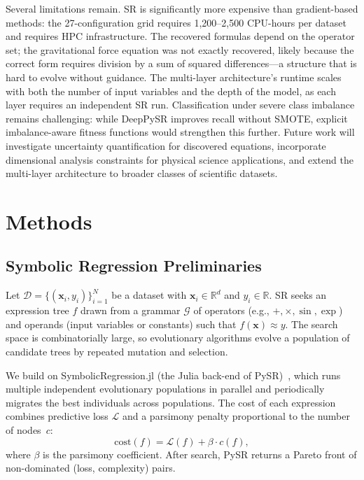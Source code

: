 \documentclass[10pt,twocolumn]{article}
\begin{document}
Several limitations remain.  SR is significantly more expensive than
gradient-based methods: the 27-configuration grid requires 1,200–2,500
CPU-hours per dataset and requires HPC infrastructure.  The recovered formulas
depend on the operator set; the gravitational force equation was not exactly
recovered, likely because the correct form requires division by a sum of
squared differences—a structure that is hard to evolve without guidance.
The multi-layer architecture's runtime scales with both the number of input
variables and the depth of the model, as each layer requires an independent
SR run.  Classification under severe class imbalance remains challenging:
while DeepPySR improves recall without SMOTE, explicit imbalance-aware fitness
functions would strengthen this further.  Future work will investigate
uncertainty quantification for discovered equations, incorporate dimensional
analysis constraints for physical science applications, and extend the
multi-layer architecture to broader classes of scientific datasets.

\section{Methods}
\label{sec:methods}

\subsection{Symbolic Regression Preliminaries}
\label{sec:sr_prelim}

Let $\mathcal{D} = \{(\mathbf{x}_i, y_i)\}_{i=1}^N$ be a dataset with
$\mathbf{x}_i \in \mathbb{R}^d$ and $y_i \in \mathbb{R}$.  SR seeks an
expression tree $f$ drawn from a grammar $\mathcal{G}$ of operators
(e.g., $+, \times, \sin, \exp$) and operands (input variables or constants)
such that $f(\mathbf{x}) \approx y$.  The search space is combinatorially
large, so evolutionary algorithms evolve a population of candidate trees by
repeated mutation and selection.

We build on SymbolicRegression.jl (the Julia back-end of
PySR)~\citep{cranmer2023interpretable}, which runs multiple independent
evolutionary populations in parallel and periodically migrates the best
individuals across populations.  The cost of each expression combines
predictive loss $\mathcal{L}$ and a parsimony penalty proportional to
the number of nodes~$c$:
\begin{equation}
  \mathrm{cost}(f) = \mathcal{L}(f) + \beta \cdot c(f),
  \label{eq:base_cost}
\end{equation}
where $\beta$ is the parsimony coefficient.  After search, PySR returns a
Pareto front of non-dominated (loss, complexity) pairs.
\end{document}
